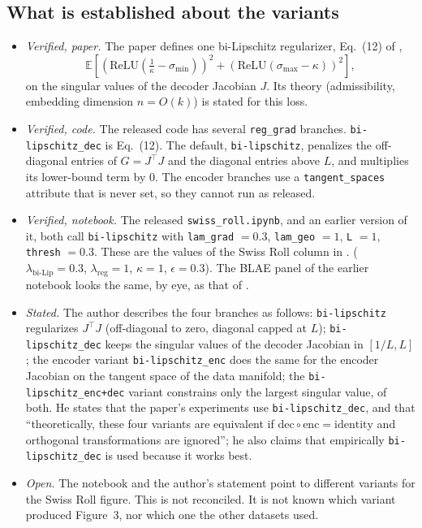 \subsection{What is established about the variants}
\label{app:bilip:facts}
\begin{itemize}[leftmargin=1.5em]
\item \emph{Verified, paper.} The paper defines one bi-Lipschitz regularizer,
Eq.~(12)
      of \cite{zhan2026blae},
      \[
      \mathbb{E}\left[\left(\mathrm{ReLU}\left(\tfrac{1}{\kappa}-\sigma_{\min}\right)\right)^2
      +\left(\mathrm{ReLU}\left(\sigma_{\max}-\kappa\right)\right)^2\right],
      \]
      on the singular values of the decoder Jacobian $J$. Its theory (admissibility,
      embedding dimension $n=O(k)$) is stated for this loss.
\item \emph{Verified, code.} The released code has several \texttt{reg\_grad}
      branches. \texttt{bi-lipschitz\_dec} is Eq.~(12). The default,
      \texttt{bi-lipschitz}, penalizes the off-diagonal entries of $G=J^\top J$ and
      the diagonal entries above $L$, and multiplies its lower-bound term by $0$.
      The encoder branches use a \texttt{tangent\_spaces} attribute that is never
      set, so they cannot run as released.
\item \emph{Verified, notebook.} The released \texttt{swiss\_roll.ipynb}, and an
      earlier version of it, both call \texttt{bi-lipschitz} with \texttt{lam\_grad}
      $=0.3$, \texttt{lam\_geo} $=1$, \texttt{L} $=1$, \texttt{thresh} $=0.3$. These
      are the values of the Swiss Roll column in \cite[Table~3]{zhan2026blae}.
      ($\lambda_{\text{bi-Lip}}=0.3$, $\lambda_{\mathrm{reg}}=1$, $\kappa=1$,
      $\epsilon=0.3$). The BLAE panel of the earlier notebook looks the same, by eye,
      as that of \cite[Figure~3]{zhan2026blae}.
\item \emph{Stated.} The author describes the four branches as follows:
      \texttt{bi-lipschitz} regularizes $J^\top J$ (off-diagonal to zero, diagonal
      capped at $L$); \texttt{bi-lipschitz\_dec} keeps the singular values of the
      decoder Jacobian in $[1/L,L]$; the encoder variant \texttt{bi-lipschitz\_enc} does the same 
      for the encoder Jacobian on the tangent space of the data manifold; 
      the \texttt{bi-lipschitz\_enc+dec} variant constrains only the largest singular value, of 
      both. He states that the paper's experiments use \texttt{bi-lipschitz\_dec}, and that 
      ``theoretically, these four variants are equivalent if 
      $\mathrm{dec}\circ\mathrm{enc}=\mathrm{identity}$ and orthogonal transformations are 
      ignored''; he also claims that empirically \texttt{bi-lipschitz\_dec}
      is used because it works best.
\item \emph{Open.} The notebook and the author's statement point to different
      variants for the Swiss Roll figure. This is not reconciled. It is not known
      which variant produced Figure~3, nor which one the other datasets used.
\end{itemize}

